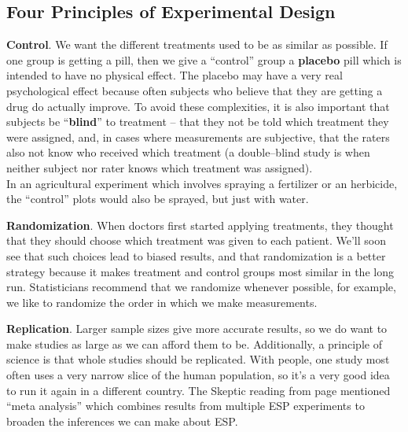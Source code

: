  \subsection { Four Principles of Experimental Design}

  {\bf Control}.  We want the different treatments used to be as
  similar as possible.  If one group is getting a pill, then we give
  a ``control'' group a {\bf placebo} pill which is intended to have no
  physical effect.  The placebo may have a very real psychological effect 
  because often subjects who believe that they are getting a drug 
  do actually improve.  To avoid these complexities, it is also
  important that subjects be ``{\bf blind}'' to treatment -- that they
  not be told which treatment they were assigned, and, in cases where
  measurements are subjective, that the raters also not know who
  received which treatment (a double--blind study is when neither
  subject nor rater knows which treatment was assigned).  
  \\
  In an agricultural experiment which involves spraying a fertilizer
  or an herbicide, the ``control'' plots would also be sprayed, but just
  with water. 

  {\bf Randomization}.  When doctors first started applying treatments,
  they thought that they should choose which treatment was given to each
  patient. We'll soon see that such choices lead to biased results, and
  that randomization is a better strategy because it makes treatment
  and control groups most similar in the long run.  Statisticians
  recommend that we randomize whenever possible, for example, we like
  to randomize the order in which we make measurements.

  {\bf Replication}. Larger sample sizes give more accurate results,
  so we do want to make studies as large as we can afford them to
  be. Additionally, a principle of science is that  whole
  studies should be replicated.  With people, one study most often uses a
  very narrow slice of the human population, so it's a very good idea
  to run it again in a different country.  The Skeptic reading from
  page \pageref{skeptoid} mentioned ``meta analysis'' which combines results from
  multiple ESP experiments to broaden the inferences we can make about
  ESP. 


